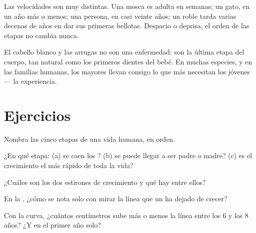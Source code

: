 \begin{example}\label{ex:g3:stages-of-life:speeds}
Las velocidades son muy distintas. Una mosca es adulta en semanas; un
gato, en un año más o menos; una persona, en casi veinte años; un
roble tarda varias decenas de años en dar sus primeras bellotas.
Despacio o deprisa, el orden de las etapas no cambia nunca.
\end{example}

\begin{remark}\label{rem:g3:stages-of-life:oldage}
El cabello blanco y las arrugas no son una enfermedad: son la última
etapa del cuerpo, tan natural como los primeros dientes del bebé. En
muchas especies, y en las familias humanas, los mayores llevan
consigo lo que más necesitan los jóvenes --- la experiencia.
\end{remark}

\section{Ejercicios}

\begin{exercise}[$\star$]\label{exo:g3:stages-of-life:1}
Nombra las cinco etapas de una vida humana, en orden.
\end{exercise}

\begin{exercise}[$\star$]\label{exo:g3:stages-of-life:2}
¿En qué etapa: (a) se caen los ? (b) se puede llegar a
ser padre o madre? (c) es el crecimiento el más rápido de toda la vida?
\end{exercise}

\begin{exercise}[$\star$]\label{exo:g3:stages-of-life:3}
¿Cuáles son los dos estirones de crecimiento y qué hay entre ellos?
\end{exercise}

\begin{exercise}[$\star$]\label{exo:g3:stages-of-life:4}
En la , ¿cómo se nota solo con mirar la línea que
un  ha dejado de crecer?
\end{exercise}

\begin{exercise}[$\star$]\label{exo:g3:stages-of-life:5}
Con la curva, ¿cuántos centímetros sube más o menos la línea entre los
$6$ y los $8$ años? ¿Y en el primer año solo?
\end{exercise}

